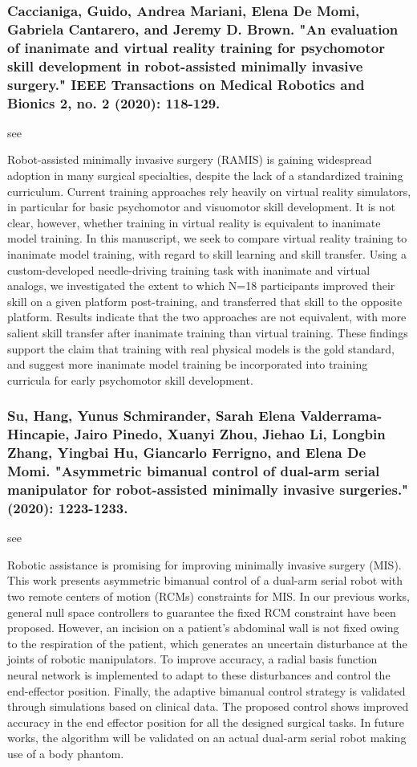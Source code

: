\documentclass[conference]{IEEEtran}
\begin{document}
\medskip
\subsubsection{Caccianiga, Guido, Andrea Mariani, Elena De Momi, Gabriela Cantarero, and Jeremy D. Brown. "An evaluation of inanimate and virtual reality training for psychomotor skill development in robot-assisted minimally invasive surgery." IEEE Transactions on Medical Robotics and Bionics 2, no. 2 (2020): 118-129.}
see \cite{caccianiga2020evaluation}

Robot-assisted minimally invasive surgery (RAMIS) is gaining widespread adoption in many surgical specialties, despite the lack of a standardized training curriculum. Current training approaches rely heavily on virtual reality simulators, in particular for basic psychomotor and visuomotor skill development. It is not clear, however, whether training in virtual reality is equivalent to inanimate model training. In this manuscript, we seek to compare virtual reality training to inanimate model training, with regard to skill learning and skill transfer. Using a custom-developed needle-driving training task with inanimate and virtual analogs, we investigated the extent to which N=18 participants improved their skill on a given platform post-training, and transferred that skill to the opposite platform. Results indicate that the two approaches are not equivalent, with more salient skill transfer after inanimate training than virtual training. These findings support the claim that training with real physical models is the gold standard, and suggest more inanimate model training be incorporated into training curricula for early psychomotor skill development.

\medskip
\subsubsection{Su, Hang, Yunus Schmirander, Sarah Elena Valderrama-Hincapie, Jairo Pinedo, Xuanyi Zhou, Jiehao Li, Longbin Zhang, Yingbai Hu, Giancarlo Ferrigno, and Elena De Momi. "Asymmetric bimanual control of dual-arm serial manipulator for robot-assisted minimally invasive surgeries." (2020): 1223-1233.}
see \cite{su2020asymmetric}

Robotic assistance is promising for improving minimally invasive surgery (MIS). This work presents asymmetric bimanual control of a dual-arm serial robot with two remote centers of motion (RCMs) constraints for MIS. In our previous works, general null space controllers to guarantee the fixed RCM constraint have been proposed. However, an incision on a patient’s abdominal wall is not fixed owing to the respiration of the patient, which generates an uncertain disturbance at the joints of robotic manipulators. To improve accuracy, a radial basis function neural network is implemented to adapt to these disturbances and control the end-effector position. Finally, the adaptive bimanual control strategy is validated through simulations based on clinical data. The proposed control shows improved accuracy in the end effector position for all the designed surgical tasks. In future works, the algorithm will be validated on an actual dual-arm serial robot making use of a body phantom.
\end{document}
